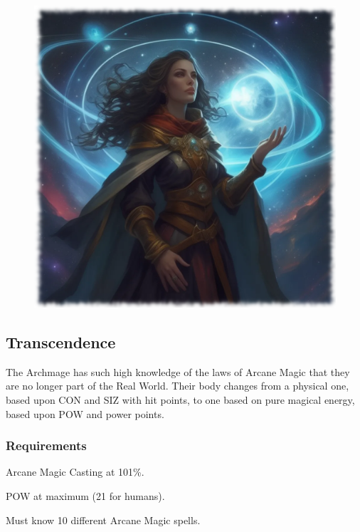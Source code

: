 \begin{figure}[h]
\begin{center}
  \includegraphics[scale=0.23]{img/ai-images/archmage.png}
\end{center}
\end{figure}

\subsection{Transcendence}
The Archmage has such high knowledge of the laws of Arcane Magic that they are no longer part of the Real World. Their body changes from a physical one, based upon CON and SIZ with hit points, to one based on pure magical energy, based upon POW and power points.

\subsubsection{Requirements}
\begin{rpg-list}
\item Arcane Magic Casting at 101\%.
\item POW at maximum (21 for humans).
\item Must know 10 different Arcane Magic spells.
\end{rpg-list}


